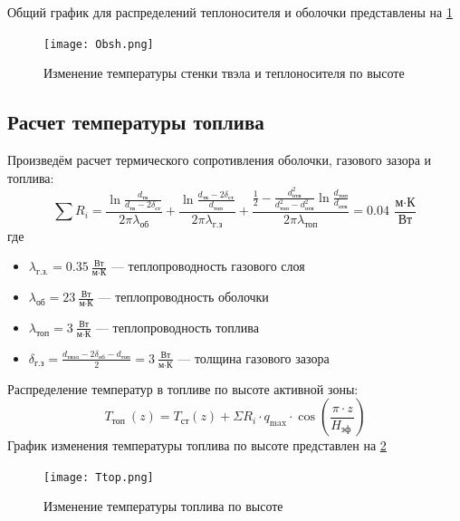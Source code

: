 Общий график для распределений теплоносителя и оболочки представлены на \ref{pic:obsh}

\begin{figure}[H]
	\begin{center}
		\texttt{[image: Obsh.png]}
		\caption{Изменение температуры стенки твэла и теплоносителя по высоте}
		\label{pic:obsh} %
	\end{center}
\end{figure}
    

\subsection{Расчет температуры топлива}
    Произведём расчет термического сопротивления оболочки, газового зазора и топлива:
$$
\sum R_i = 
\frac {\ln \frac {d_{\text{тв}}}{d_{\text{тв}} - 2\delta_{ст}}  }{2\pi\lambda_{\text{об}}}+\frac {\ln \frac {d_{\text{тв}} - 2\delta_{ст}}{d_{\text{топ}}}  }{2\pi\lambda_{\text{г.з}}}+\frac {\frac 1 2 - \frac {d_{\text{отв}}^2} {d_{\text{топ}}^2 - d_{\text{отв}}^2}\ln \frac {d_{\text{топ}}}{d_{\text{отв}}}} {2 \pi \lambda_{\text{топ}}} = 0.04\  \frac{\text{м} \cdot \text{К}}{\text{Вт}}
$$
где
\begin{itemize}
    \item $\lambda_{\text{г.з.}} = 0.35\  \frac {\text{Вт}}{\text{м} \cdot \text{К}}$ — теплопроводность газового слоя 
    \item $\lambda_{\text{об}} = 23\  \frac {\text{Вт}}{\text{м} \cdot \text{К}}$ — теплопроводность оболочки 
    \item $\lambda_{\text{топ}} = 3\  \frac {\text{Вт}}{\text{м} \cdot \text{К}}$ — теплопроводность топлива
    \item $\delta_{\text{г.з}} =\frac {d_{\text{твэл}} - 2\delta_{\text{об}} - d_{\text{топ}}}{2} =  3\  \frac {\text{Вт}}{\text{м} \cdot \text{К}}$ — толщина газового зазора 
\end{itemize}
Распределение температур в топливе по высоте активной зоны:
$$
T_{\text {топ }}(z)=T_{\mathrm{ст}}(z)+\Sigma R_{i} \cdot q_{\max } \cdot \cos \left(\frac{\pi \cdot z}{H_{\text {эф }}}\right)
$$
График изменения температуры топлива по высоте представлен на \ref{pic:top}
\begin{figure}[H]
	\begin{center}
		\texttt{[image: Ttop.png]}
		\caption{Изменение температуры топлива по высоте}
		\label{pic:top} %
	\end{center}
\end{figure}

